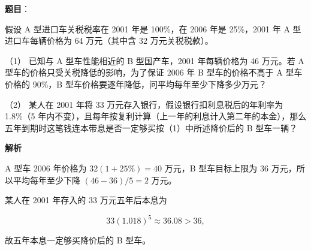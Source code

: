 \begin{answer}

\textbf{题目}：

假设 A 型进口车关税税率在 2001 年是 100\%，在 2006 年是 25\%，2001 年 A 型进口车每辆价格为 64 万元（其中含 32 万元关税税款）。

（1） 已知与 A 型车性能相近的 B 型国产车，2001 年每辆价格为 46 万元。若 A 型车的价格只受关税降低的影响，为了保证 2006 年 B 型车的价格不高于 A 型车价格的 90\%，B 型车价格要逐年降低，问平均每年至少下降多少万元？

（2） 某人在 2001 年将 33 万元存入银行，假设银行扣利息税后的年利率为 1.8\%（5 年内不变），且每年按复利计算（上一年的利息计入第二年的本金），那么五年到期时这笔钱连本带息是否一定够买按（1）中所述降价后的 B 型车一辆？

\textbf{解析}


A 型车 2006 年价格为 $32(1+25\%)=40$ 万元，B 型车目标上限为 $36$ 万元，所以平均每年至少下降 $(46-36)/5=2$ 万元。


某人在 2001 年存入的 33 万元五年后本息为

\nopagebreak[4]
\[
33(1.018)^5\approx36.08>36,
\]

故五年本息一定够买降价后的 B 型车。



\end{answer}
